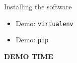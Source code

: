 \documentclass[english,compress]{beamer}
\def\bigncentered#1{
  \begin{center}
    \Huge\bfseries #1
  \end{center}
}
\begin{document}
\begin{frame}{Installing the software}
  \begin{itemize}
    \item Demo: \texttt{virtualenv}
    \item Demo: \texttt{pip}
  \end{itemize}
\end{frame}
\begin{frame}
  \bigncentered{DEMO TIME}
\end{frame}
\end{document}
